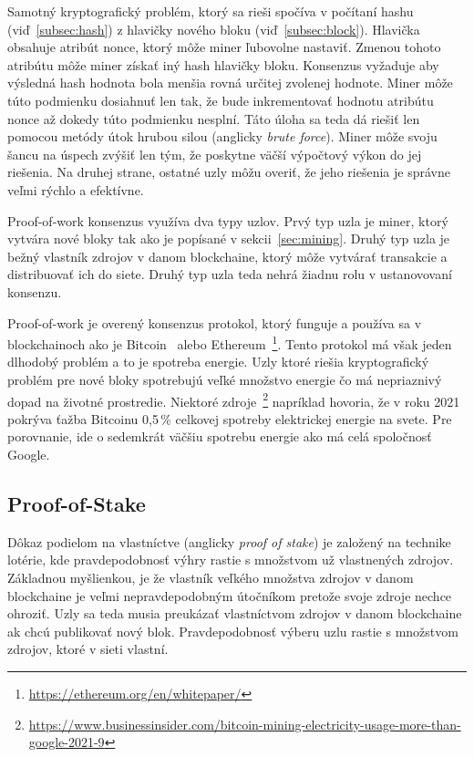 Samotný kryptografický problém, ktorý sa rieši spočíva v počítaní hashu (viď~\ref{subsec:hash}) z hlavičky nového bloku (viď~\ref{subsec:block}). Hlavička obsahuje atribút nonce, ktorý môže miner ľubovolne nastaviť. Zmenou tohoto atribútu môže miner získať iný hash hlavičky bloku. Konsenzus vyžaduje aby výsledná hash hodnota bola menšia rovná určitej zvolenej hodnote. Miner môže túto podmienku dosiahnuť len tak, že bude inkrementovať hodnotu atribútu nonce až dokedy túto podmienku nesplní. Táto úloha sa teda dá riešiť len pomocou metódy útok hrubou silou (anglicky \textit{brute force}). Miner môže svoju šancu na úspech zvýšiť len tým, že poskytne väčší výpočtový výkon do jej riešenia. Na druhej strane, ostatné uzly môžu overiť, že jeho riešenia je správne veľmi rýchlo a efektívne.~\cite{zhengBlockchainOverview}

Proof-of-work konsenzus využíva dva typy uzlov. Prvý typ uzla je miner, ktorý vytvára nové bloky tak ako je popísané v sekcii~\ref{sec:mining}. Druhý typ uzla je bežný vlastník zdrojov v danom blockchaine, ktorý môže vytvárať transakcie a distribuovať ich do siete. Druhý typ uzla teda nehrá žiadnu rolu v ustanovovaní konsenzu.~\cite{leporeConsensus}

Proof-of-work je overený konsenzus protokol, ktorý funguje a používa sa v blockchainoch ako je Bitcoin~\cite{satoshiBitcoin} alebo Ethereum~\footnote{\url{https://ethereum.org/en/whitepaper/}}. Tento protokol má však jeden dlhodobý problém a to je spotreba energie. Uzly ktoré riešia kryptografický problém pre nové bloky spotrebujú veľké množstvo energie čo má nepriaznivý dopad na životné prostredie. Niektoré zdroje~\footnote{\url{https://www.businessinsider.com/bitcoin-mining-electricity-usage-more-than-google-2021-9}} napríklad hovoria, že v roku 2021 pokrýva ťažba Bitcoinu 0,5\,\% celkovej spotreby elektrickej energie na svete. Pre porovnanie, ide o sedemkrát väčšiu spotrebu energie ako má celá spoločnosť Google.~\cite{leporeConsensus}

\subsection{Proof-of-Stake}\label{subsec:pos}

Dôkaz podielom na vlastníctve (anglicky \textit{proof of stake}) je založený na technike lotérie, kde pravdepodobnosť výhry rastie s množstvom už vlastnených zdrojov. Základnou myšlienkou, je že vlastník veľkého množstva zdrojov v danom blockchaine je veľmi nepravdepodobným útočníkom pretože svoje zdroje nechce ohroziť. Uzly sa teda musia preukázať vlastníctvom zdrojov v danom blockchaine ak chcú publikovať nový blok. Pravdepodobnosť výberu uzlu rastie s množstvom zdrojov, ktoré v sieti vlastní.~\cite{homoliakBlockchain, nguyenPos}

